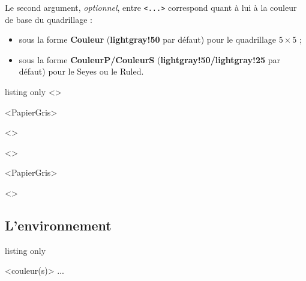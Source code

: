 \documentclass[a4paper]{article}
\newcommand\Cle[1]{{\bfseries\sffamily\textlangle #1\textrangle}}
\begin{document}
Le second argument, \textit{optionnel}, entre \texttt{<...>} correspond quant à lui à la couleur de base du quadrillage :

\begin{itemize}
	\item sous la forme \Cle{Couleur} (\Cle{lightgray!50} par défaut) pour le quadrillage $5\times5$ ;
	\item sous la forme \Cle{CouleurP/CouleurS} (\Cle{lightgray!50/lightgray!25} par défaut) pour le Seyes ou le Ruled.
\end{itemize}

\medskip

\begin{PresentationCode}{listing only}
\AffQuadrillage[NbCarreaux=16x4,Grille=Seyes,ReglureSeyes=2.5,AffBarre=false]<\CoulSeyes>

\AffQuadrillage[NbCarreaux=36x6,Elargir=3/3]<PapierGris>

\begin{center}
	\AffQuadrillage[NbCarreaux=12x3,Elargir=2/2,Grille=Ruled,Marge=2]<\CoulRuled>
\end{center}
\end{PresentationCode}

\medskip

\AffQuadrillage[NbCarreaux=18x4,Grille=Seyes,ReglureSeyes=2.5,AffBarre=false]<\CoulSeyes>

\medskip

\AffQuadrillage[NbCarreaux=36x8,Elargir=3/3]<PapierGris>

\begin{center}
	\AffQuadrillage[NbCarreaux=12x3,Elargir=2/2,Grille=Ruled,Marge=2]<\CoulRuled>
\end{center}

\pagebreak

\subsection{L'environnement}

\begin{PresentationCode}{listing only}

\begin{EnvQuadrillage}[clés]<couleur(s)>
	...
\end{EnvQuadrillage}
\end{PresentationCode}
\end{document}
